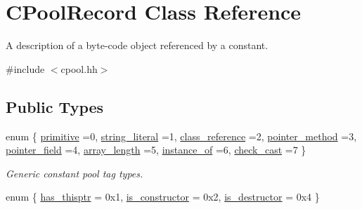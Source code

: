 \hypertarget{class_c_pool_record}{}\section{C\+Pool\+Record Class Reference}
\label{class_c_pool_record}


A description of a byte-\/code object referenced by a constant.  




{\ttfamily \#include $<$cpool.\+hh$>$}

\subsection*{Public Types}
\begin{DoxyCompactItemize}
\item 
enum \{ \newline
\mbox{\hyperlink{class_c_pool_record_aa2fb908facf346a63c6955dfce38d28cadf1cb2c66b5e01f2170e02336c159f54}{primitive}} =0, 
\mbox{\hyperlink{class_c_pool_record_aa2fb908facf346a63c6955dfce38d28ca40b253c70f46d208ef0751f7d2187883}{string\+\_\+literal}} =1, 
\mbox{\hyperlink{class_c_pool_record_aa2fb908facf346a63c6955dfce38d28caeab4f3648bb871a77817df086580e35e}{class\+\_\+reference}} =2, 
\mbox{\hyperlink{class_c_pool_record_aa2fb908facf346a63c6955dfce38d28ca2207a5a2a89024d807c584bab89ba70e}{pointer\+\_\+method}} =3, 
\newline
\mbox{\hyperlink{class_c_pool_record_aa2fb908facf346a63c6955dfce38d28caeffcebdc00d951a0458eb912f8eb3021}{pointer\+\_\+field}} =4, 
\mbox{\hyperlink{class_c_pool_record_aa2fb908facf346a63c6955dfce38d28ca7392c3a68961b55aeb64563ac6f4e98b}{array\+\_\+length}} =5, 
\mbox{\hyperlink{class_c_pool_record_aa2fb908facf346a63c6955dfce38d28ca7c2a3073f546c1fa94baffffebec3808}{instance\+\_\+of}} =6, 
\mbox{\hyperlink{class_c_pool_record_aa2fb908facf346a63c6955dfce38d28ca30c7b50576ba8e866ea7021222a7efd9}{check\+\_\+cast}} =7
 \}
\begin{DoxyCompactList}\small\item\em Generic constant pool tag types. \end{DoxyCompactList}\item 
enum \{ \mbox{\hyperlink{class_c_pool_record_a92aa4d86973592fab6a5cbfca928531da9477b3144a0e88fe3456ae0d6abaf6b7}{has\+\_\+thisptr}} = 0x1, 
\mbox{\hyperlink{class_c_pool_record_a92aa4d86973592fab6a5cbfca928531da6bfee9ac4bc91767a14ca2364000f7a2}{is\+\_\+constructor}} = 0x2, 
\mbox{\hyperlink{class_c_pool_record_a92aa4d86973592fab6a5cbfca928531da7dde1f68585723c485e437cc5fe2dc7b}{is\+\_\+destructor}} = 0x4
 \}
\end{DoxyCompactItemize}
